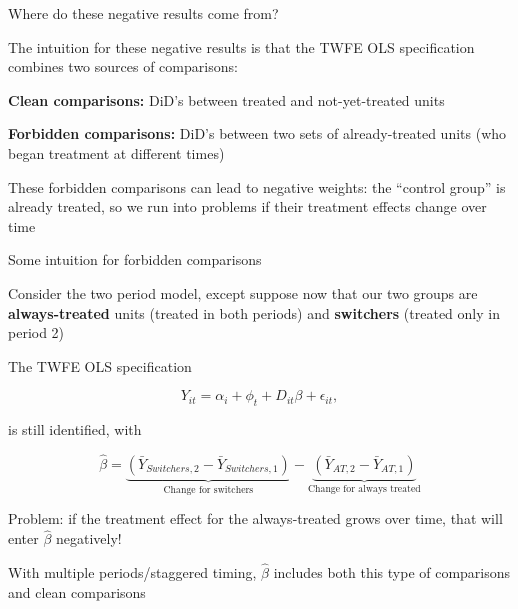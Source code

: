 \documentclass[aspectratio = 169, 13pt]{beamer}
\begin{document}
\begin{frame}{Where do these negative results come from?}
  \begin{wideitemize}
    \item
    The intuition for these negative results is that the TWFE OLS specification combines two sources of comparisons:

    \medskip

    \begin{enumerate}
      {\normalsize
      \item
            \textbf{Clean comparisons:} DiD's between treated and not-yet-treated units

            \medskip

      \item
            \textbf{Forbidden comparisons:} DiD's between two sets of already-treated units (who began treatment at different times)
            }
    \end{enumerate}

    \item
    These forbidden comparisons can lead to negative weights: the ``control group'' is already treated, so we run into problems if their treatment effects change over time
  \end{wideitemize}
\end{frame}

\begin{frame}{Some intuition for forbidden comparisons}
  \begin{wideitemize}
    \item
    Consider the two period model, except suppose now that our two groups are \textbf{always-treated} units (treated in both periods) and \textbf{switchers} (treated only in period 2)

    \item
    The TWFE OLS specification

    $$ Y_{it} = \alpha_i + \phi_t + D_{it} \beta  + \epsilon_{it},$$

    is still identified, with

    $$\hat\beta =  \underbrace{ \left(\bar{Y}_{Switchers, 2} - \bar{Y}_{Switchers, 1} \right) }_{\text{Change for switchers}} - \underbrace{ \left(\bar{Y}_{AT, 2} - \bar{Y}_{AT, 1} \right) }_{\text{Change for always treated}}  $$

    \item
    Problem: if the treatment effect for the always-treated grows over time, that will enter $\hat\beta$ negatively!

    \item
    With multiple periods/staggered timing, $\hat\beta$ includes both this type of comparisons and clean comparisons
  \end{wideitemize}
\end{frame}
\end{document}
